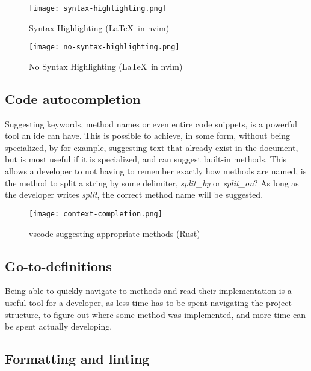 \begin{figure}
  \centering
  \texttt{[image: syntax-highlighting.png]}
  \caption{Syntax Highlighting (\LaTeX\ in \gls*{nvim})}
  \label{pic:stx}
\end{figure}

\begin{figure}
  \centering
  \texttt{[image: no-syntax-highlighting.png]}
  \caption{No Syntax Highlighting (\LaTeX\ in \gls*{nvim})}
  \label{pic:noStx}
\end{figure}

\subsection{Code autocompletion}

Suggesting keywords, method names or even entire code snippets, is a powerful
tool an \gls*{ide} can have. This is possible to achieve, in some form, without
being specialized, by for example, suggesting text that already exist in the
document, but is most useful if it is specialized, and can suggest built-in
methods. This allows a developer to not having to remember exactly how methods
are named, is the method to split a string by some delimiter, \textit{split\_by}
or \textit{split\_on}? As long as the developer writes \textit{split}, the
correct method name will be suggested.

\begin{figure}
  \centering
  \texttt{[image: context-completion.png]}
  \caption{\gls*{vscode} suggesting appropriate methods (Rust)}
  \label{pic:completion}
\end{figure}

\subsection{Go-to-definitions}

Being able to quickly navigate to methods and read their implementation is a
useful tool for a developer, as less time has to be spent navigating the project
structure, to figure out where some method was implemented, and more time can be
spent actually developing.

\subsection{Formatting and linting}

